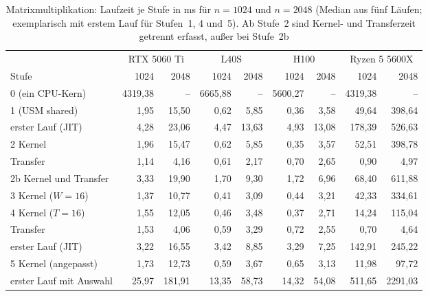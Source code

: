 \documentclass[12pt,a4paper]{article}
\begin{document}
\begin{table}[H]
\centering
\footnotesize
\setlength{\tabcolsep}{3.5pt}
\caption[Matrixmultiplikation: Laufzeit je Stufe (ms)]{Matrixmultiplikation: Laufzeit je Stufe in ms für $n = 1024$ und $n = 2048$ (Median aus fünf Läufen; exemplarisch mit erstem Lauf für Stufen~1, 4 und~5). Ab Stufe~2 sind Kernel- und Transferzeit getrennt erfasst, außer bei Stufe~2b}
\label{tab:zeiten}
\begin{tabular}{@{}l*{8}{r}@{}}
\toprule
 & \multicolumn{2}{c}{RTX 5060 Ti} & \multicolumn{2}{c}{L40S} & \multicolumn{2}{c}{H100} & \multicolumn{2}{c}{Ryzen 5 5600X} \\
\cmidrule(lr){2-3}\cmidrule(lr){4-5}\cmidrule(lr){6-7}\cmidrule(l){8-9}
Stufe & 1024 & 2048 & 1024 & 2048 & 1024 & 2048 & 1024 & 2048 \\
\midrule
0 (ein CPU-Kern)              & 4319,38 & --     & 6665,88 & --    & 5600,27 & --    & 4319,38 & --      \\
1 (USM shared)                & 1,95    & 15,50  & 0,62    & 5,85  & 0,36    & 3,58  & 49,64   & 398,64  \\
\quad erster Lauf (JIT)       & 4,28    & 23,06  & 4,47    & 13,63 & 4,93    & 13,08 & 178,39  & 526,63  \\
2 Kernel                      & 1,96    & 15,47  & 0,62    & 5,85  & 0,35    & 3,57  & 52,51   & 398,78  \\
\quad Transfer                & 1,14    & 4,16   & 0,61    & 2,17  & 0,70    & 2,65  & 0,90    & 4,97    \\
2b Kernel und Transfer        & 3,33    & 19,90  & 1,70    & 9,30  & 1,72    & 6,96  & 68,40   & 611,88  \\
3 Kernel ($W = 16$)           & 1,37    & 10,77  & 0,41    & 3,09  & 0,44    & 3,21  & 42,33   & 334,61  \\
4 Kernel ($T = 16$)           & 1,55    & 12,05  & 0,46    & 3,48  & 0,37    & 2,71  & 14,24   & 115,04  \\
\quad Transfer                & 1,53    & 4,06   & 0,59    & 3,29  & 0,72    & 2,55  & 0,70    & 4,64    \\
\quad erster Lauf (JIT)       & 3,22    & 16,55  & 3,42    & 8,85  & 3,29    & 7,25  & 142,91  & 245,22  \\
5 Kernel (angepasst)          & 1,73    & 12,73  & 0,59    & 3,67  & 0,65    & 3,13  & 11,98   & 97,72   \\
\quad erster Lauf mit Auswahl & 25,97   & 181,91 & 13,35   & 58,73 & 14,32   & 54,08 & 511,65  & 2291,03 \\
\bottomrule
\end{tabular}
\end{table}
\end{document}
